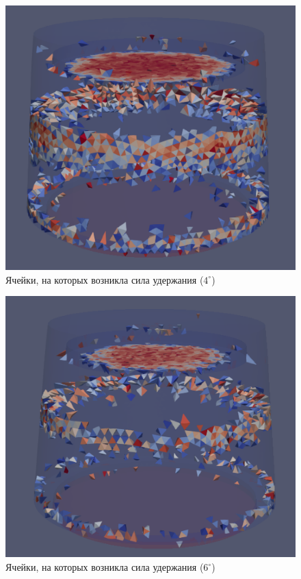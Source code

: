 \documentclass[a4paper, 14pt]{extreport}
\begin{document}
\begin{figure}[H]
	\center
	\includegraphics[scale=0.6]{pictures_diploma/push4-4deg.png}
	\caption{Ячейки, на которых возникла сила удержания ($4^{\circ}$)}
	\label{fig: push4-4deg}
\end{figure}

\begin{figure}[H]
	\center
	\includegraphics[scale=0.6]{pictures_diploma/push4-6deg.png}
	\caption{Ячейки, на которых возникла сила удержания ($6^{\circ}$)}
	\label{fig: push4-6deg}
\end{figure}
\end{document}
